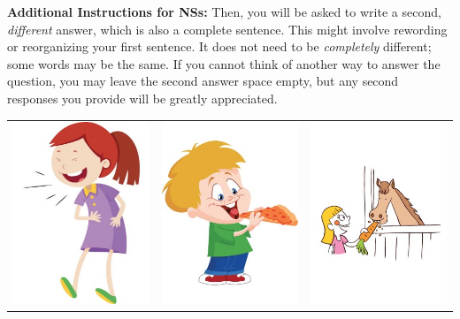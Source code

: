 \begin{exe}
  \ex\label{exe:pdt-instructions-b}\textbf{Additional Instructions for NSs:} Then, you will be asked to write a second, \textit{different} answer, which is also a complete sentence. This might involve rewording or reorganizing your first sentence. It does not need to be \textit{completely} different; some words may be the same. If you cannot think of another way to answer the question, you may leave the second answer space empty, but any second responses you provide will be greatly appreciated.
\end{exe}

\begin{table}[htb!]
\begin{center}
\begin{tabular}{|c|c|c|}
\hline
{\includegraphics[width=0.29\columnwidth]{figures/I20.jpg}} & {\includegraphics[width=0.3\columnwidth]{figures/I02.jpg}} & {\includegraphics[width=0.3\columnwidth]{figures/I17.jpg}} \\

\end{tabular}
\end{center}
\end{table}
